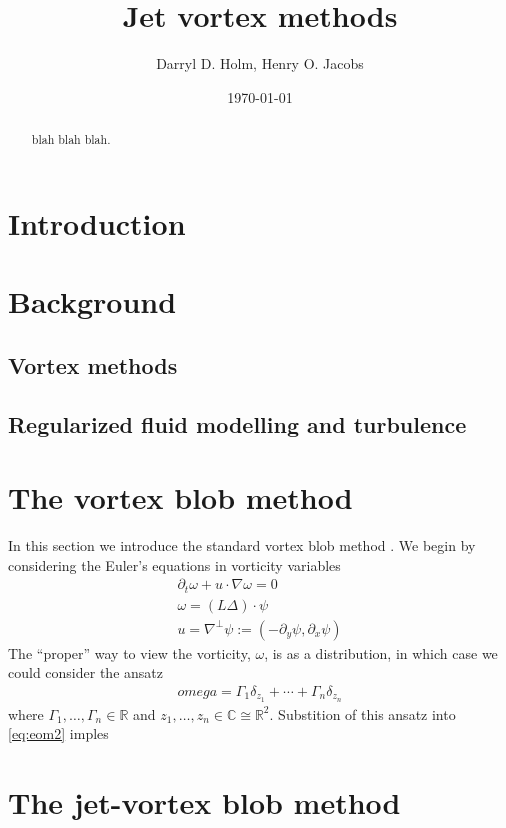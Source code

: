 \documentclass[12pt]{amsart}
\title{Jet vortex methods}
\author{Darryl D. Holm, Henry O. Jacobs}
\date{\today}
\begin{document}
\maketitle

\begin{abstract}
  blah blah blah.
\end{abstract}

\section{Introduction}
\label{sec:intro}

\section{Background}

\subsection{Vortex methods}

\subsection{Regularized fluid modelling and turbulence}


\section{The vortex blob method}
\label{sec:vortex_blob}
In this section we introduce the standard vortex blob method .
We begin by considering the Euler's equations in vorticity variables
\begin{align}
  \partial_t \omega + u \cdot \nabla \omega = 0 \label{eq:eom1} \\
  \omega = (L \Delta) \cdot \psi \label{eq:eom2} \\
  u = \nabla^\perp \psi := (- \partial_y \psi, \partial_x \psi)
\end{align}
The ``proper'' way to view the vorticity, $\omega$, is as a distribution,
in which case we could consider the ansatz
\begin{align*}
  omega = \Gamma_1 \delta_{z_1} + \cdots + \Gamma_n \delta_{z_n}
\end{align*} 
where $\Gamma_1,\dots,\Gamma_n \in \mathbb{R}$
and $z_1,\dots,z_n \in \mathbb{C} \cong \mathbb{R}^2$.
Substition of this ansatz into \eqref{eq:eom2} imples


\section{The jet-vortex blob method}
\label{sec:jet_vortex_blob}
\end{document}
